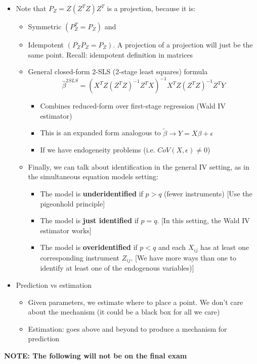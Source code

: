 \documentclass[10pt, oneside]{article}
\begin{document}
\begin{itemize}
\begin{itemize}
    \end{itemize}
    \item Note that $P_Z = Z(Z^TZ) Z^T$ is a projection, because it is:
    \begin{itemize}
        \item Symmetric $(P_Z^T = P_Z)$ and 
        \item Idempotent $(P_ZP_Z = P_Z)$. A projection of a projection will just be the same point. Recall: idempotent definition in matrices
        \item General closed-form 2-SLS (2-stage least squares) formula
        \[\hat \beta^{2SLS} = (X^T Z(Z^T Z)^{-1} Z^T X)^{-1} X^T Z(Z^TZ)^{-1} Z^T Y\]
        \begin{itemize}
            \item Combines reduced-form over first-stage regression (Wald IV estimator)
            \item This is an expanded form analogous to $\tilde \beta \rightarrow Y = X\beta + \epsilon$
            \item If we have endogeneity problems (i.e. $CoV(X, \epsilon) \neq 0$)
        \end{itemize}
        \item Finally, we can talk about identification in the general IV setting, as in the simultaneous equation models setting:
        \begin{itemize}
            \item The model is \textbf{underidentified} if $p>q$ (fewer instruments) [Use the pigeonhold principle]
            \item The model is \textbf{just identified} if $p=q$. [In this setting, the Wald IV estimator works]
            \item The model is \textbf{overidentified} if $p < q$ and each $X_{ij}$ has at least one corresponding instrument $Z_{ij}$. [We have more ways than one to identify at least one of the endogenous variables)]
        \end{itemize}
    \end{itemize}
    \item Prediction vs estimation
    \begin{itemize}
        \item Given parameters, we estimate where to place a point. We don't care about the mechanism (it could be a black box for all we care)
        \item Estimation: goes above and beyond to produce a mechanism for prediction
    \end{itemize}
\end{itemize}
\textbf{NOTE: The following will not be on the final exam}
\end{document}
